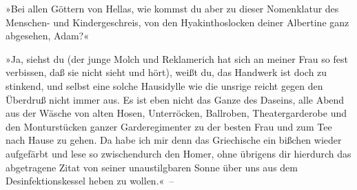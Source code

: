 »Bei allen Göttern von Hellas, wie kommst du aber zu dieser
Nomenklatur des Menschen- und Kindergeschreis, von den
Hyakinthoslocken deiner Albertine ganz abgesehen, Adam?«

»Ja, siehst du (der junge Molch und Reklamerich hat sich an meiner
Frau so fest verbissen, daß sie nicht sieht und hört), weißt du,
das Handwerk ist doch zu stinkend, und selbst eine solche
Hausidylle wie die unsrige reicht gegen den Überdruß nicht immer
aus. Es ist eben nicht das Ganze des Daseins, alle Abend aus der
Wäsche von alten Hosen, Unterröcken, Ballroben, Theatergarderobe
und den Monturstücken ganzer Garderegimenter zu der besten Frau und
zum Tee nach Hause zu gehen. Da habe ich mir denn das Griechische
ein bißchen wieder aufgefärbt und lese so zwischendurch den Homer,
ohne übrigens dir hierdurch das abgetragene Zitat von seiner
unaustilgbaren Sonne über uns aus dem Desinfektionskessel heben zu
wollen.«~–


